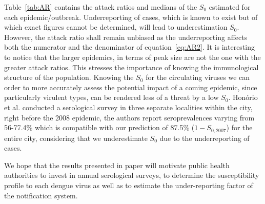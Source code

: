 \documentclass[10pt]{article}
\begin{document}
Table~\ref{tab:AR} contains the attack ratios and medians of the $S_0$ 
estimated for each epidemic/outbreak.
 Underreporting of cases, which is known to exist but of which exact figures 
cannot be determined, will lead to underestimation $S_0$.
However, the attack ratio shall remain unbiased as the underreporting affects 
both the numerator and the denominator of equation~\ref{eq:AR2}.
It is interesting to notice that the larger epidemics, in terms of peak size 
are not the one with the greater attack ratios.
This stresses the importance of knowing the immunological structure of the 
population.
Knowing the $S_0$ for the circulating viruses we can order to more 
accurately assess the potential impact of a coming epidemic, since particularly 
virulent types, can be rendered less of a threat by a low $S_0$.
Hon\'orio et al.\citep{honorio2009spatial} conducted a serological survey in 
three separate localities within the city, right before the 2008 epidemic, the 
authors report seroprevalences varying from 56-77.4\% which is compatible with 
our prediction of 87.5\% ($1-S_{0,2007}$) for the entire city, considering that 
we underestimate $S_0$ due to the underreporting of cases.

We hope that the results presented in paper will motivate public 
health authorities to invest in annual serological surveys, to determine the 
susceptibility profile to each dengue virus as well as to estimate the 
under-reporting factor of the notification system.
\end{document}
